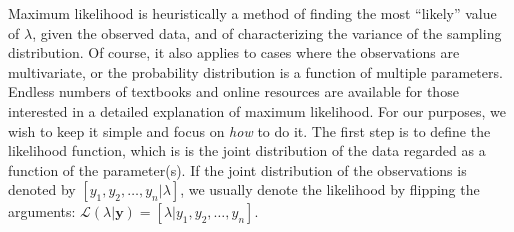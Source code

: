 Maximum likelihood is heuristically a method of finding the most ``likely''
value of $\lambda$, given the observed data, and of characterizing the
variance of the sampling distribution. Of course, it also applies to
cases where the observations are multivariate, or the probability
distribution is a function of multiple parameters. Endless numbers of
textbooks and online resources are available for those interested in a
detailed explanation of maximum likelihood. For our purposes, we wish
to keep it simple and focus on \textit{how} to do it. The first step
is to define the likelihood function, which is
is the joint distribution of the data regarded as a function of
the parameter(s). If the joint distribution of the observations is
denoted by $[y_1, y_2, \dots, y_n | \lambda]$, we usually denote the
likelihood by flipping the arguments:
$\mathcal{L}(\lambda | \mathbf{y}) = [\lambda | y_1, y_2, \dots, y_n]$.

